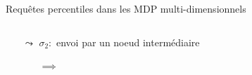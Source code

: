 \documentclass[compress]{beamer}
\begin{document}
\begin{frame}{Requêtes percentiles dans les MDP multi-dimensionnels}
\begin{center}
\begin{columns}
\begin{column}{0.6\linewidth}
{\begin{itemize}
            \item[$\leadsto$] $\sigma_2 : $ envoi par un noeud intermédiaire
            \begin{itemize}
              \item[$\implies$] 
          \end{itemize}
        \end{itemize}
        }
      \end{column}
    \end{columns}
  \end{center}

\end{frame}
\end{document}

